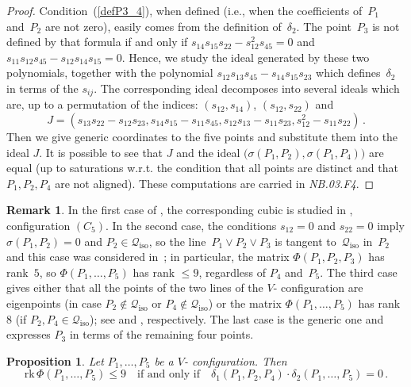 \documentclass[a4paper, 11pt, reqno]{amsart}
\theoremstyle{plain}
\newtheorem{prop}[lemma]{Proposition}
\theoremstyle{definition}
\newtheorem{rmk}[lemma]{Remark}
\newcommand{\nb}[2]{\textsl{{NB}.{#1}.{#2}}}
\newcommand{\rk}{\ensuremath{\mathrm{rk}}}
\newcommand{\iso}{\mathcal{Q}_{\mathrm{iso}}}
\begin{document}
\begin{proof}
Condition~(\ref{defP3_4}), when defined (i.e., when the coefficients of~$P_1$ and~$P_2$ are not zero), easily comes from the definition of~$\delta_2$.
The point~$P_3$ is not defined by that formula if and only if
$s_{14}s_{15}s_{22}-s_{12}^2s_{45}=0$ and $s_{11}s_{12}s_{45}-s_{12}s_{14}s_{15}=0$.
Hence, we study the ideal generated by these two polynomials, together with the
polynomial $s_{12}s_{13}s_{45}-s_{14}s_{15} s_{23}$ which defines~$\delta_2$ in terms of the $s_{ij}$. The corresponding
ideal decomposes into several ideals which are, up to a permutation of
the indices: $(s_{12}, s_{14})$, $(s_{12}, s_{22})$ and
%
\[
  J = (s_{13}s_{22} - s_{12}s_{23}, s_{14}s_{15} - s_{11}s_{45}, s_{12}s_{13} -
  s_{11}s_{23}, s_{12}^2 - s_{11}s_{22}) \,.
\]
%
Then we give generic coordinates to the five
points and substitute them into the ideal $J$. It is possible to see that
$J$ and the ideal $\bigl(\sigma(P_1, P_2), \sigma(P_1, P_4)\bigr)$ are equal (up to
saturations w.r.t. the condition that all points are distinct and that $P_1, P_2, P_4$ are not aligned).
These computations are carried in \nb{03}{F4}.
\end{proof}
%
\begin{rmk}
In the first case of , the corresponding cubic
is studied in , configuration $(C_5)$.
In the second case, the conditions $s_{12}=0$ and $s_{22}=0$ imply $\sigma(P_1, P_2) = 0$ and $P_2\in \iso$, so the line~$P_1 \vee P_2 \vee P_3$ is tangent to~$\iso$ in~$P_2$
and this case was considered in~; in particular,
the matrix $\Phi(P_1, P_2, P_3)$ has rank~$5$, so
$\Phi(P_1, \dots, P_5)$ has rank $\le 9$, regardless of
$P_4$ and~$P_5$.
The third case gives either that all the
points of the two lines of the $V$- configuration are eigenpoints (in case
$P_2 \not\in \iso$ or $P_4 \not\in \iso$) or the matrix $\Phi(P_1, \dots, P_5)$
has rank~$8$ (if $P_2, P_4 \in \iso$); see  and , respectively.
The last case is the generic one and expresses $P_3$ in terms of the remaining four points.
\end{rmk}
%
\begin{prop}
\label{proposition:d1d2}
Let $P_1, \dots, P_5$ be a $V$- configuration. Then
%
\[
  \rk \,\Phi(P_1, \dots, P_5) \leq 9
  \quad \mbox{if and only if} \quad
  \delta_1(P_1, P_2, P_4) \cdot \delta_2(P_1, \dots, P_5) = 0 \,.
\]
%
\end{prop}
\end{document}
